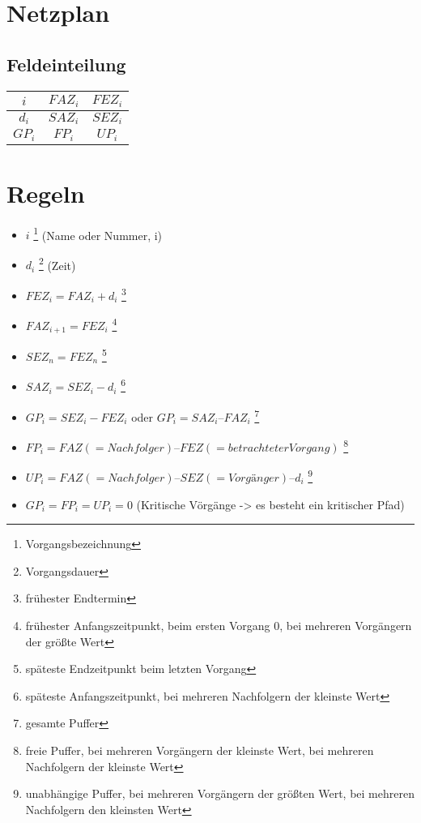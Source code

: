 \documentclass[a4paper,12pt]{scrartcl}
\begin{document}
\section{Netzplan}
\subsection{Feldeinteilung}
\begin{table}[ht]
\centering
\begin{tabular}{|c|c|c|}
\hline
  $i$ & $FAZ_i$ & $FEZ_i$ \\
\hline  
  $d_i$ & $SAZ_i$ & $SEZ_i$ \\
\hline
  $GP_i$ & $FP_i$ & $UP_i$ \\
\hline
 \end{tabular}
\end{table}%
 
\section{Regeln}
\begin{itemize}
\item $i$ \footnote{Vorgangsbezeichnung} (Name oder Nummer, i) 
\item $d_i$ \footnote{Vorgangsdauer} (Zeit)
\item $FEZ_i = FAZ_i + d_i$ \footnote{frühester Endtermin}
\item $FAZ_{i+1} = FEZ_i$ \footnote{frühester Anfangszeitpunkt, beim ersten Vorgang 0, bei mehreren Vorgängern der größte Wert}
\item $SEZ_n = FEZ_n$ \footnote{späteste Endzeitpunkt beim letzten Vorgang}
\item $SAZ_i = SEZ_i - d_i$ \footnote{späteste Anfangszeitpunkt, bei mehreren Nachfolgern der kleinste Wert}
\item $GP_i = SEZ_i - FEZ_i$ oder $GP_i = SAZ_i – FAZ_i$ \footnote{gesamte Puffer}
\item $FP_i = FAZ (= Nachfolger) – FEZ (= betrachteter Vorgang)$ \footnote{freie Puffer, bei mehreren Vorgängern der kleinste Wert, bei mehreren Nachfolgern der kleinste Wert}
\item $UP_i = FAZ (= Nachfolger) – SEZ (= Vorgänger) – d_i$ \footnote{unabhängige Puffer, bei mehreren Vorgängern der größten Wert, bei mehreren Nachfolgern den kleinsten Wert}
\item $GP_i = FP_i = UP_i = 0$ (Kritische Vörgänge -> es besteht ein kritischer Pfad)

\end{itemize}
\end{document}
